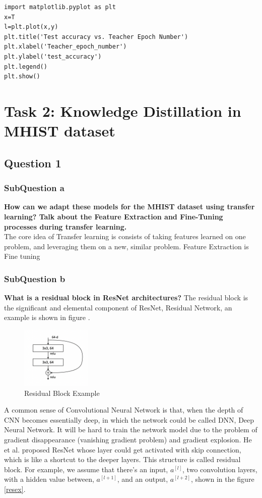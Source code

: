 \documentclass[conference]{IEEEtran}
\begin{document}
\begin{lstlisting}
import matplotlib.pyplot as plt
x=T
l=plt.plot(x,y)
plt.title('Test accuracy vs. Teacher Epoch Number')
plt.xlabel('Teacher_epoch_number')
plt.ylabel('test_accuracy')
plt.legend()
plt.show()
\end{lstlisting}
\section{Task 2: Knowledge Distillation in MHIST dataset}

\subsection{Question 1}
\subsubsection{SubQuestion a} \textbf{How can we adapt these models for the MHIST dataset using transfer learning? Talk about the Feature Extraction and Fine-Tuning processes during transfer learning.}\\

The core idea of Transfer learning is consists of taking features learned on one problem, and leveraging them on a new, similar problem.\cite{keras}
Feature Extraction is 
\\
Fine tuning
\cite{blog}
\subsubsection{SubQuestion b} \textbf{What is a residual block in ResNet architectures?}
The residual block is the significant and elemental component of ResNet, Residual Network, an example is shown in figure \label{res}.

\begin{figure}[h] 
    \centering
    \includegraphics[width=0.3\textwidth]{./graphs/Task2/res-block.png}
    \caption{Residual Block Example}
    \label{res}
\end{figure}

A common sense of Convolutional Neural Network is that, when the depth of CNN becomes essentially deep, in which the network could be called DNN, Deep Neural Network. It will be hard to train the network model due to the problem of gradient disappearance (vanishing gradient problem) and gradient explosion. He et al.\cite{resnet} proposed ResNet whose layer could get activated with skip connection, which is like a shortcut to the deeper layers. This structure is called residual block. For example, we assume that there's an input, $a^{[l]}$, two convolution layers, with a hidden value between, $a^{[l+1]}$, and an output, $a^{[l+2]}$, shown in the figure \ref{resex}\cite{wu}.
\end{document}

